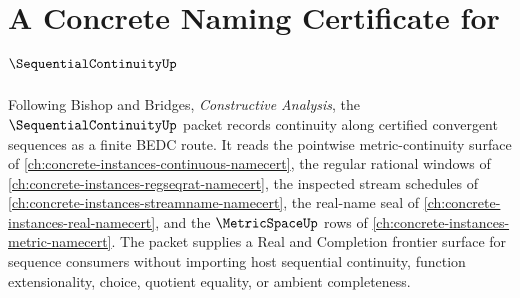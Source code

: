\chapter{A Concrete Naming Certificate for $\SequentialContinuityUp$}
\label{ch:concrete-instances-sequentialcontinuity-namecert}

Following Bishop and Bridges, \emph{Constructive Analysis}, the $\SequentialContinuityUp$ packet records continuity along certified convergent sequences as a finite BEDC route. It reads the pointwise metric-continuity surface of \autoref{ch:concrete-instances-continuous-namecert}, the regular rational windows of \autoref{ch:concrete-instances-regseqrat-namecert}, the inspected stream schedules of \autoref{ch:concrete-instances-streamname-namecert}, the real-name seal of \autoref{ch:concrete-instances-real-namecert}, and the $\MetricSpaceUp$ rows of \autoref{ch:concrete-instances-metric-namecert}. The packet supplies a Real and Completion frontier surface for sequence consumers without importing host sequential continuity, function extensionality, choice, quotient equality, or ambient completeness.

